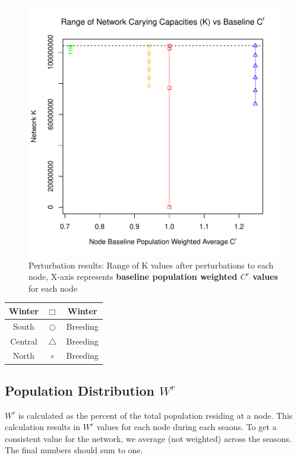 \documentclass[10pt]{article}
\begin{document}
\vspace{-.5cm}
\begin{figure}[H]
\begin{center}
\includegraphics[width=.8\textwidth, height=.8\textwidth]{RGraphics-monarch_barcr_averageCR}
\caption{Perturbation results: Range of K values after perturbations to each node, X-axis represents {\bf{baseline population weighted $C^r$ values}} for each node}\label{fig:monarch_barcr_averageCR}
\end{center}
\end{figure}

\vspace{-.5cm}
\begin{tabular}{|c|c|c|}
\hline
{\color{red} Winter} & $\Box$ & Winter \\
\hline
{\color{orange} South} & $\bigcirc$ & Breeding \\
\hline
{\color{blue} Central} & $\triangle$ &  Breeding \\
\hline
{\color{green} North} & $\circ$ & Breeding \\
\hline
\end{tabular}








\newpage
\subsection{Population Distribution \texorpdfstring{$W^r$}{WR}}

$W^r$ is calculated as the percent of the total population residing at a node. This calculation results in $W^r$ values for each node during each seaons. To get a consistent value for the network, we average (not weighted) across the seasons. The final numbers should sum to one.
\end{document}
